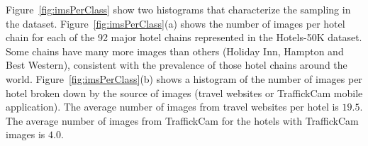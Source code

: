 Figure~\ref{fig:imsPerClass} show two histograms that characterize the sampling in the dataset. Figure~\ref{fig:imsPerClass}(a) shows the number of images per hotel chain for each of the 92 major hotel chains represented in the Hotels-50K dataset.  Some chains have many more images than others (Holiday Inn, Hampton and Best Western), consistent with the prevalence of those hotel chains around the world.  Figure~\ref{fig:imsPerClass}(b) shows a histogram of the number of images per hotel broken down by the source of images (travel websites or TraffickCam mobile application). The average number of images from travel websites per hotel is $19.5$. The average number of images from TraffickCam for the hotels with TraffickCam images is $4.0$.

\newcommand{\chnConfusionHeight}{.65in}
\begin{figure}[t]
    \centering
    \begin{tabular}{lccc}

\end{tabular}
\end{figure}
